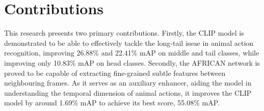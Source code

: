 \section{Contributions}
This research presents two primary contributions. Firstly, the CLIP model is demonstrated to be able to effectively tackle the long-tail issue in animal action recognition, improving 26.88\% and 22.41\% mAP on middle and tail classes, while improving only 10.83\% mAP on head classes. Secondly, the AFRICAN network is proved to be capable of extracting fine-grained subtle features between neighbouring frames. As it serves as an auxiliary enhancer, aiding the model in understanding the temporal dimension of animal actions, it improves the CLIP model by around 1.69\% mAP to achieve its best score, 55.08\% mAP.

